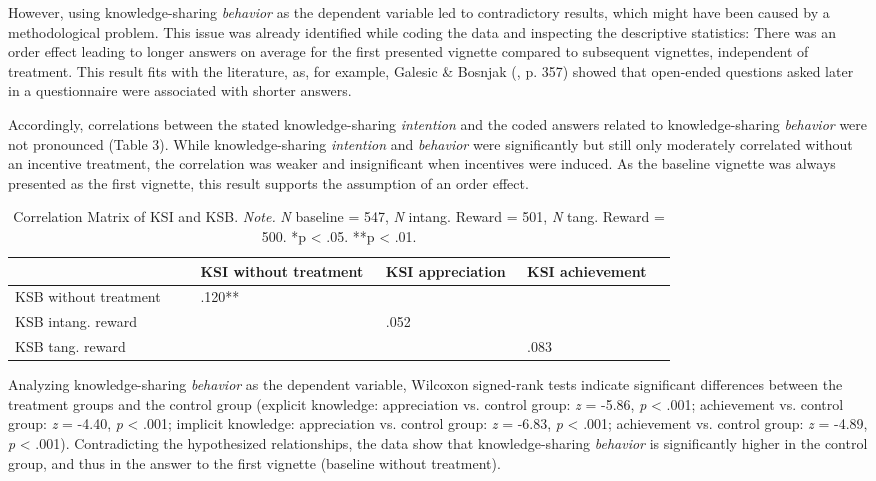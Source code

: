 \documentclass[twocolumn, serif, empirical, authordate]{jote-article}
\begin{document}
However, using knowledge-sharing \emph{behavior} as the dependent variable led to contradictory results, which might have been caused by a methodological problem. This issue was already identified while coding the data and inspecting the descriptive statistics: There was an order effect leading to longer answers on average for the first presented vignette compared to subsequent vignettes, independent of treatment.
This result fits with the literature, as, for example, Galesic \& Bosnjak (\citeyear{Galesic2009}, p. 357)  showed that open-ended questions asked later in a questionnaire were associated with shorter answers.

Accordingly, correlations between the stated knowledge-sharing \emph{intention} and the coded answers related to knowledge-sharing \emph{behavior} were not pronounced (Table 3). While knowledge-sharing \emph{intention} and \emph{behavior} were significantly but still only moderately correlated without an incentive treatment, the correlation was weaker and insignificant when incentives were induced. As the baseline vignette was always presented as the first vignette, this result supports the assumption of an order effect.




\begin{table}[h!]\sffamily
\caption{Correlation Matrix of KSI and KSB. \emph{Note.} \emph{N} baseline = 547, \emph{N} intang. Reward = 501, \emph{N} tang. Reward = 500.
*p \textless{} .05. **p \textless{} .01. }
\label{tab:table2}

\begin{tabularx}{\columnwidth}{>{\raggedright\arraybackslash}p{0.2193\linewidth} >{\raggedright\arraybackslash}p{0.2116\linewidth} >{\raggedright\arraybackslash}p{0.1669\linewidth} >{\raggedright\arraybackslash}p{0.1714\linewidth}}
       & \textbf{KSI without treatment} & KSI appreciation & KSI achievement\\ \toprule
KSB without treatment & .120** &  & \\ 
KSB intang. reward &  & .052  & \\ 
KSB tang. reward &  &  & .083 
\end{tabularx}

\end{table} 


Analyzing knowledge-sharing \emph{behavior} as the dependent variable, Wilcoxon signed-rank tests indicate significant differences between the treatment groups and the control group (explicit knowledge: appreciation vs. control group: \emph{z} = -5.86, \emph{p} \textless{} .001; achievement vs. control group: \emph{z} = -4.40, \emph{p} \textless{} .001; implicit knowledge: appreciation vs. control group: \emph{z} = -6.83, \emph{p} \textless{} .001; achievement vs. control group: \emph{z} = -4.89, \emph{p} \textless{} .001). Contradicting the hypothesized relationships, the data show that knowledge-sharing \emph{behavior} is significantly higher in the control group, and thus in the answer to the first vignette (baseline without treatment).
\end{document}
